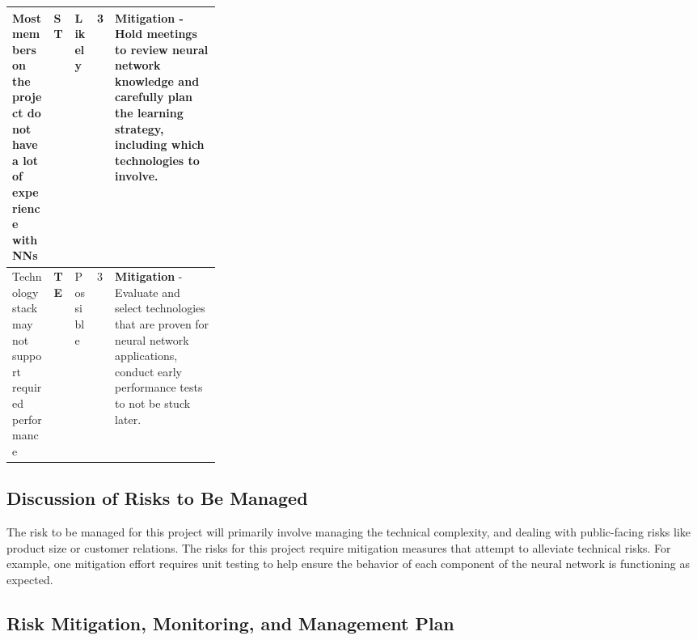 \documentclass[english,12pt]{article}
\begin{document}
\begin{longtable}{|P{0.20\linewidth}|P{0.10\linewidth}|P{0.10cm}|P{0.5cm}|P{5.5cm}|}
  Most members on the project do not have a lot of experience with NNs & \textbf{ST} & Likely & 3 & 
  \small \textbf{Mitigation} - Hold meetings to review neural network knowledge and carefully plan the learning strategy, including which technologies to involve.\\
  \hline

  Technology stack may not support required performance & \textbf{TE} & Possible & 3 & 
  \small \textbf{Mitigation} - Evaluate and select technologies that are proven for neural network applications, conduct early performance tests to not be stuck later.\\
  \hline

\end{longtable}

\subsection{Discussion of Risks to Be Managed}
The risk to be managed for this project will primarily involve managing the technical complexity,
and dealing with public-facing risks like product size or customer relations. The risks for 
this project require mitigation measures that attempt to alleviate technical risks. For example,
one mitigation effort requires unit testing to help ensure the behavior of each component
of the neural network is functioning as expected.
\pagebreak
\subsection{Risk Mitigation, Monitoring, and Management Plan}
\end{document}
